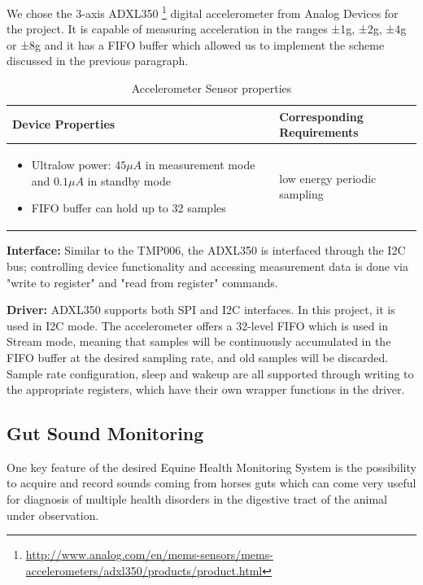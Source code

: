 We chose the 3-axis  ADXL350 \footnote{\url{http://www.analog.com/en/mems-sensors/mems-accelerometers/adxl350/products/product.html}} digital accelerometer from Analog Devices for the project. It is capable of measuring acceleration in the ranges ±1g, ±2g, ±4g or ±8g and it has a FIFO buffer which allowed us to implement the scheme discussed in the previous paragraph.

\begin{table}[htb]
\centering
\begin{tabular}{|m{}|m{}|}
\hline 
	\textbf{Device Properties} &
	\textbf{Corresponding Requirements}  \\ 
\hline
	\phantom{.}
	\begin{itemize}
	\item Ultralow power: $45 \mu A$ in measurement mode and $0.1 \mu A$ in standby mode
	\item FIFO buffer can hold up to 32 samples
	\end{itemize} &
	low energy periodic sampling  \\ 
\hline 
\end{tabular} 
\caption{Accelerometer Sensor properties}
\label{tab:accelerometer_properties}
\end{table}

\textbf{Interface:} Similar to the TMP006, the ADXL350 is interfaced through the I2C bus; controlling device functionality and accessing measurement data is done via "write to register" and "read from register" commands. 

\textbf{Driver:} ADXL350 supports both SPI and I2C interfaces. In this project, it is used in I2C mode. The accelerometer offers a 32-level FIFO which is used in Stream mode, meaning that samples will be continuously accumulated in the FIFO buffer at the desired sampling rate, and old samples will be discarded. Sample rate configuration, sleep and wakeup are all supported through writing to the appropriate registers, which have their own wrapper functions in the driver.
 
\subsection{Gut Sound Monitoring}
One key feature of the desired Equine Health Monitoring System is the possibility to acquire and record sounds coming from horses guts which can come very useful for diagnosis of multiple health disorders in the digestive tract of the animal under observation.

